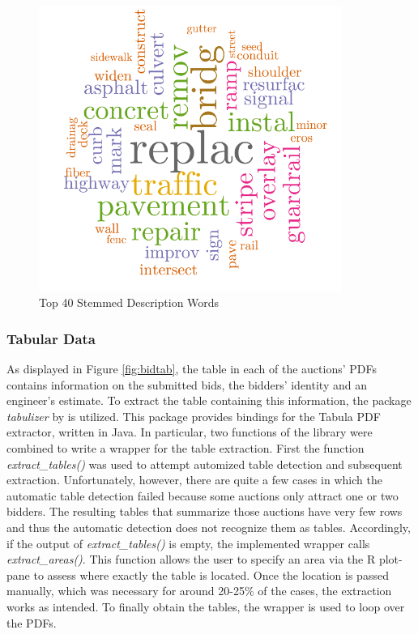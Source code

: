 \documentclass[a4paper,12pt, headsepline]{scrartcl}
\numberwithin{equation}{section}
\begin{document}
\begin{figure}[H]
	\includegraphics[width = 9.9cm]{figures/description_words_cloud_cropped2.pdf}
	\caption{Top 40 Stemmed Description Words}\label{fig:desc}
\end{figure}

\subsubsection{Tabular Data}\label{subsec:tab}

As displayed in Figure \ref{fig:bidtab}, the table in each of the auctions' PDFs contains information on the submitted bids, the bidders' identity and an engineer's estimate. To extract the table containing this information, the package \textit{tabulizer} by \citet{tabulizer} is utilized. This package provides bindings for the Tabula PDF extractor, written in Java. In particular, two functions of the library were combined to write a wrapper for the table extraction. First the function \textit{extract\_tables()} was used to attempt automized table detection and subsequent extraction. Unfortunately, however, there are quite a few cases in which the automatic table detection failed because some auctions only attract one or two bidders. The resulting tables that summarize those auctions have very few rows and thus the automatic detection does not recognize them as tables. Accordingly, if the output of \textit{extract\_tables()} is empty, the implemented wrapper calls \textit{extract\_areas()}. This function allows the user to specify an area via the R plot-pane to assess where exactly the table is located. Once the location is passed manually, which was necessary for around 20-25\% of the cases, the extraction works as intended. To finally obtain the tables, the wrapper is used to loop over the PDFs.
\end{document}
